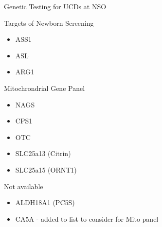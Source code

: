 \documentclass[presentation, smaller]{beamer}
\begin{document}
\begin{frame}[label={sec:orgheadline21}]{Genetic Testing for UCDs at NSO}
\begin{block}{Targets of Newborn Screening}
\begin{itemize}
\item ASS1
\item ASL
\item ARG1
\end{itemize}
\end{block}
\begin{block}{Mitochrondrial Gene Panel}
\begin{itemize}
\item NAGS
\item CPS1
\item OTC
\item SLC25a13 (Citrin)
\item SLC25a15 (ORNT1)
\end{itemize}
\end{block}

\begin{block}{Not available}
\begin{itemize}
\item ALDH18A1 (PC5S)
\item CA5A - added to list to consider for Mito panel
\end{itemize}
\end{block}
\end{frame}
\end{document}
